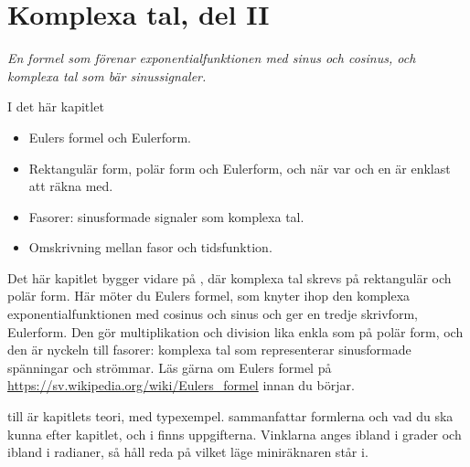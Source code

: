 
\chapter{Komplexa tal, del II}
\label{c16:ch}

{\large\itshape En formel som förenar exponentialfunktionen med sinus och cosinus, och komplexa tal
som bär sinussignaler.\par}

\begin{chapterbox}{I det här kapitlet}
\begin{itemize}
  \item Eulers formel och Eulerform.
  \item Rektangulär form, polär form och Eulerform, och när var och en är enklast att räkna med.
  \item Fasorer: sinusformade signaler som komplexa tal.
  \item Omskrivning mellan fasor och tidsfunktion.
\end{itemize}
\end{chapterbox}

Det här kapitlet bygger vidare på , där komplexa tal skrevs på rektangulär och polär
form. Här möter du Eulers formel, som knyter ihop den komplexa exponentialfunktionen med cosinus
och sinus och ger en tredje skrivform, Eulerform. Den gör multiplikation och division lika enkla
som på polär form, och den är nyckeln till fasorer: komplexa tal som representerar sinusformade
spänningar och strömmar. Läs gärna om Eulers formel på \url{https://sv.wikipedia.org/wiki/Eulers_formel}
innan du börjar.

 till  är kapitlets teori, med typexempel.
 sammanfattar formlerna och vad du ska kunna efter kapitlet, och i
 finns uppgifterna. Vinklarna anges ibland i grader och ibland i
radianer, så håll reda på vilket läge miniräknaren står i.




